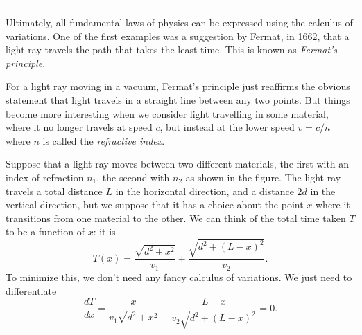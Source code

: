 \documentclass[11pt,a4paper,twoside]{article}
\newcommand{\pnum}[1]{\makebox[0pt][r]{\scriptsize\textbf{[#1]}\hspace{0.7em}}}
\begin{document}
\par\vspace{0.6em}\hrule\vspace{0.8em}
\noindent\pnum{28}Ultimately, all fundamental laws of physics can be expressed using the calculus of variations. One of the first examples was a suggestion by Fermat, in 1662, that a light ray travels the path that takes the least time. This is known as \textit{Fermat's principle}.

\noindent\pnum{29}For a light ray moving in a vacuum, Fermat's principle just reaffirms
the obvious statement that light travels in a straight line between any two points. But things become more interesting when we consider light travelling in some material, where it no longer travels at speed $c$, but instead at the lower speed $v=c/n$ where $n$ is called the \textit{refractive index}.

\begin{figure}
    \centering
\end{figure}
\noindent\pnum{30}Suppose that a light ray moves between two different materials, the first with an index of refraction $n_1$, the second with $n_2$ as shown in the figure. The light ray travels a total distance $L$ in the horizontal direction, and a distance $2d$ in the vertical direction, but we suppose that it has a choice about the point $x$ where it transitions from one material to the other. We can think of the total time taken $T$ to be a function of $x$: it is
\[
    T(x)=\frac{\sqrt{d^2+x^2}}{v_1}
    +\frac{\sqrt{d^2+(L-x)^2}}{v_2}.
\]
\noindent\pnum{31}To minimize this, we don't need any fancy calculus of variations. We just need to differentiate
\begin{equation}
    \frac{dT}{dx}=\frac{x}{v_1\sqrt{d^2+x^2}}
    -\frac{L-x}{v_2\sqrt{d^2+(L-x)^2}}=0.
    \tag{7.20}
\end{equation}
\end{document}
